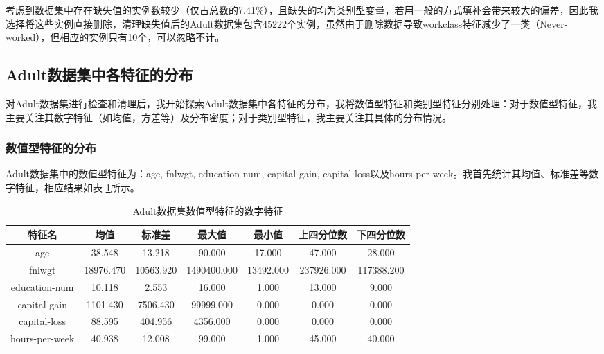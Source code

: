 \documentclass[12pt,a4paper]{article}
\theoremstyle{definition}
\begin{document}
\vspace{0.01\linewidth}
考虑到数据集中存在缺失值的实例数较少（仅占总数的7.41\%），且缺失的均为类别型变量，若用一般的方式填补会带来较大的偏差，因此我选择将这些实例直接删除，清理缺失值后的Adult数据集包含45222个实例，虽然由于删除数据导致workclass特征减少了一类（Never-worked），但相应的实例只有10个，可以忽略不计。

\subsection{Adult数据集中各特征的分布}

对Adult数据集进行检查和清理后，我开始探索Adult数据集中各特征的分布，我将数值型特征和类别型特征分别处理：对于数值型特征，我主要关注其数字特征（如均值，方差等）及分布密度；对于类别型特征，我主要关注其具体的分布情况。

\subsubsection{数值型特征的分布}
\label{sec:num_feature}

Adult数据集中的数值型特征为：age, fnlwgt, education-num, capital-gain, capital-loss以及hours-per-week。我首先统计其均值、标准差等数字特征，相应结果如表 \ref{tab:num_feature_avg}所示。

\begin{table}[H]
	\renewcommand\arraystretch{1.5}
	\caption{Adult数据集数值型特征的数字特征}
	\label{tab:num_feature_avg}
	\centering
	
	\begin{tabular}{c|c|c|c|c|c|c}
		\centering
		 特征名 &  均值 & 标准差 & 最大值 & 最小值 &  上四分位数 & 下四分位数 \\
		\hline
		\hline
		age & 38.548 & 13.218 & 90.000 & 17.000 & 47.000 & 28.000 \\
		fnlwgt & 18976.470 & 10563.920 & 1490400.000 & 13492.000 & 237926.000 & 117388.200 \\
		education-num & 10.118 & 2.553 & 16.000 & 1.000 & 13.000 & 9.000 \\
		capital-gain & 1101.430 & 7506.430 & 99999.000 & 0.000 & 0.000 & 0.000 \\
		capital-loss & 88.595 & 404.956 & 4356.000 & 0.000 & 0.000 & 0.000 \\
		hours-per-week & 40.938 & 12.008 & 99.000 & 1.000 & 45.000 & 40.000 \\

	\end{tabular}
\end{table}
\end{document}
